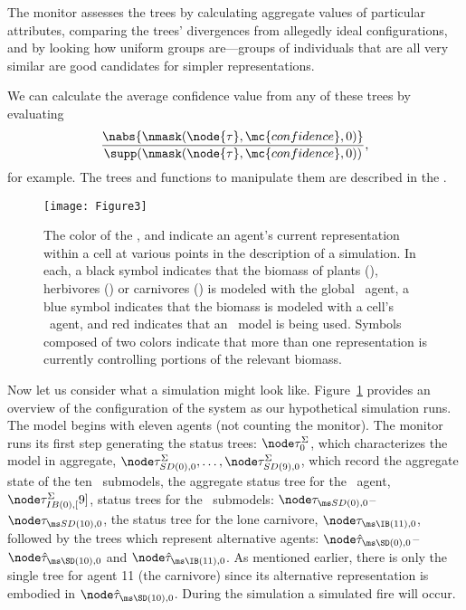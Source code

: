 The monitor assesses the trees by calculating aggregate values of
particular attributes, comparing the trees' divergences from allegedly
ideal con\-fig\-ur\-a\-tions, and by looking how uniform groups are---groups
of in\-di\-vidu\-als that are all very similar are good candidates for
simpler rep\-re\-sen\-ta\-tions. 

We can calculate the average confidence value from any of these trees
by evaluating \[
\frac{\nabs{\nmask(\node{\tau},
    \mc{confidence},0)}}{\supp(\nmask(\node{\tau},
  \mc{confidence},0))},
\]
for example. The trees and functions to manipulate them are described
in the \appendixname.



\begin{figure}\label{timeline}
\begin{center}
  \texttt{[image: Figure3]}
  \caption{The color of the , and 
    indicate an agent's current rep\-re\-sen\-ta\-tion within a cell
    at various points in the description of a simulation.  In each, a
    black symbol indicates that the biomass of plants (), herbivores
    () or carnivores () is modeled with the global \SD\ agent, a
    blue symbol indicates that the biomass is modeled with a cell's
    \SD\ agent, and red indicates that an \IB\ model is being
    used. Symbols composed of two colors indicate that more than one
    rep\-re\-sen\-ta\-tion is currently controlling portions of the
    relevant biomass.}
\end{center}
\end{figure}

Now let us consider what a simulation might look
like. Figure~\ref{timeline}
provides an overview of the con\-fig\-ur\-a\-tion of the system
as our hypothetical simulation runs. The model begins with eleven
agents (not counting the monitor). The monitor runs its first step
generating the status trees: $\stmA{0}$, which characterizes the model
in aggregate, $\stsdA{0}{0},\ldots,\stsdA{9}{0}$, which record the
aggregate state of the ten \SD\ submodels, the aggregate status tree for
the \IB\ agent, $\stibA{0}[9]$, status trees for the \SD\ submodels:
$\stsd{0}{0}$--$\stsd{10}{0}$, the status tree for the lone carnivore,
$\sta{\IB}{11}{0}$, followed by the trees which represent alternative
agents: $\asta{\SD}{0}{0}$--$\asta{\SD}{10}{0}$ and
$\asta{\IB}{11}{0}$.  As mentioned earlier, there is only the single
tree for agent 11 (the carnivore) since its alternative rep\-re\-sen\-ta\-tion
is embodied in $\asta{\SD}{10}{0}$. During the simulation a simulated
fire will occur.

